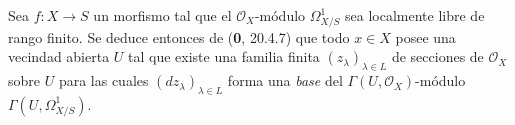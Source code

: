 \begin{remark}[16.10.6]
\label{IV.16.10.6}
Sea $f:X\to S$ un morfismo tal que el $\mathcal{O}_X$-módulo
$\varOmega_{X/S}^1$ sea localmente libre de rango finito. Se deduce entonces de
(\textbf 0, 20.4.7) que todo $x\in X$ posee una vecindad abierta $U$ tal que existe
una familia finita $(z_\lambda)_{\lambda\in L}$ de secciones de
$\mathcal{O}_X$ sobre $U$ para las cuales $(dz_\lambda)_{\lambda\in L}$
forma una \emph{base} del $\Gamma(U,\mathcal{O}_X)$-módulo
$\Gamma(U,\varOmega_{X/S}^1)$.
\end{remark}
